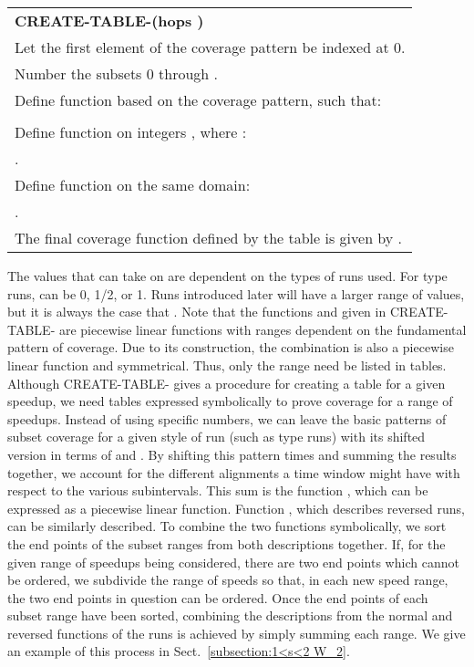 \documentclass[11pt]{article}
\newcommand{\tab}{\hspace{.25in}}
\begin{document}
\begin{table}[!hbt]
\begin{tabular}{l}
\smallskip \\
\toprule
\textbf{CREATE-TABLE-(hops )} \\
\midrule
\tab Let the first element of the coverage pattern be indexed at 0.\\
\tab Number the subsets 0 through .\\
\tab Define function  based on the coverage pattern, such that:\\
\tab \tab  \\
\tab Define function  on integers , where :\\
\tab \tab .\\
\tab Define function  on the same domain:\\
\tab \tab .\\
\tab The final coverage function defined by the table is given by .\\
\bottomrule
\end{tabular}
\end{table}

The values that  can take on are dependent on the types of runs used.  For type  runs,  can be 0, 1/2, or 1.  Runs introduced later will have a larger range of values, but it is always the case that .  Note that the functions  and  given in CREATE-TABLE- are piecewise linear functions with ranges dependent on the fundamental pattern of coverage.  Due to its construction, the combination  is also a piecewise linear function and symmetrical.  Thus, only the range  need be listed in tables.\\

Although CREATE-TABLE- gives a procedure for creating a table for a given speedup, we need tables expressed symbolically to prove coverage for a range of speedups.  Instead of using specific numbers, we can leave the basic patterns of subset coverage for a given style of run (such as type  runs) with its shifted version in terms of  and .  By shifting this pattern  times and summing the results together, we account for the different alignments a time window might have with respect to the various subintervals.  This sum is the function , which can be expressed as a piecewise linear function.  Function , which describes reversed runs, can be similarly described.  To combine the two functions symbolically, we sort the end points of the subset ranges from both descriptions together.  If, for the given range of speedups being considered, there are two end points which cannot be ordered, we subdivide the range of speeds so that, in each new speed range, the two end points in question can be ordered.  Once the end points of each subset range have been sorted, combining the descriptions from the normal and reversed functions of the runs is achieved by simply summing each range.  We give an example of this process in Sect.~\ref{subsection:1<s<2 W_2}.
\end{document}

